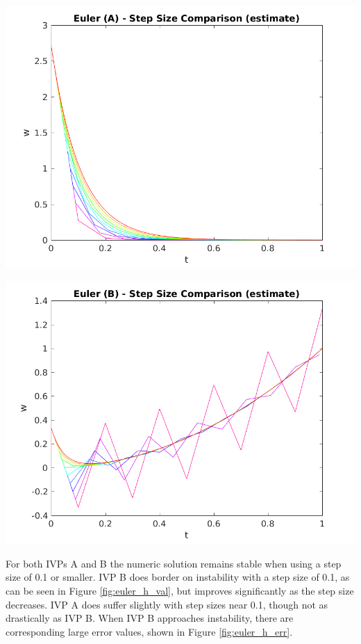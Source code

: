 \documentclass{article}
\begin{document}
\begin{center}
	\centering
    \begin{minipage}{0.5\textwidth}
        \centering
	    \includegraphics[width=1\textwidth]{../output/a_euler_h_val.png}
    \end{minipage}\hfill
    \begin{minipage}{0.5\textwidth}
        \centering
	    \includegraphics[width=1\textwidth]{../output/b_euler_h_val.png}
    \end{minipage}
 	\label{fig:euler_h_val}
\end{center}

For both IVPs A and B the numeric solution remains stable when using a step size of 0.1 or smaller. IVP B does border on instability with a step size of 0.1, as can be seen in Figure \ref{fig:euler_h_val}, but improves significantly as the step size decreases. IVP A does suffer slightly with step sizes near 0.1, though not as drastically as IVP B. When IVP B approaches instability, there are corresponding large error values, shown in Figure \ref{fig:euler_h_err}.
\end{document}
